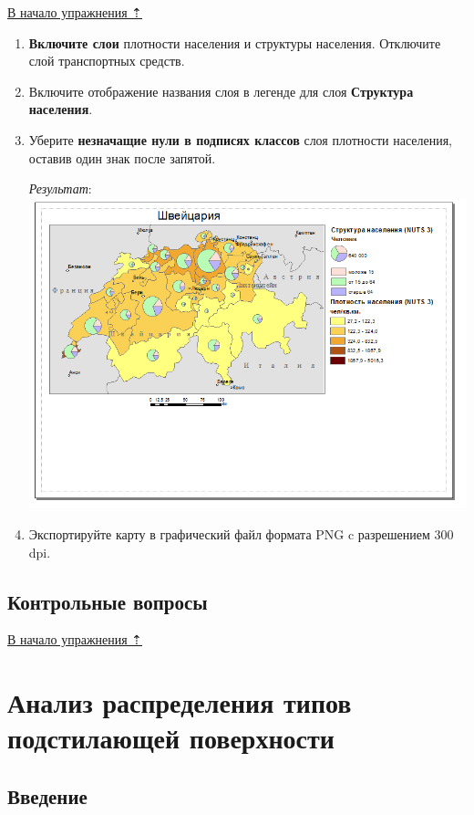 \documentclass[]{book}
\theoremstyle{definition}
\theoremstyle{definition}
\theoremstyle{definition}
\theoremstyle{remark}
\begin{document}
\protect\hyperlink{stat-map-economic}{В начало упражнения ⇡}

\begin{enumerate}
\def\labelenumi{\arabic{enumi}.}
\item
  \textbf{Включите слои} плотности населения и структуры населения.
  Отключите слой транспортных средств.
\item
  Включите отображение названия слоя в легенде для слоя
  \textbf{Структура населения}.
\item
  Уберите \textbf{незначащие нули в подписях классов} слоя плотности
  населения, оставив один знак после запятой.

  \emph{Результат}: \includegraphics{images/Ex08/image34.png}
\item
  Экспортируйте карту в графический файл формата PNG c разрешением 300
  dpi.
\end{enumerate}

\hypertarget{stat-map-economic-export-questions}{%
\section{Контрольные вопросы}\label{stat-map-economic-export-questions}}

\protect\hyperlink{stat-map-economic}{В начало упражнения ⇡}

\hypertarget{land-cover-hydro}{%
\chapter{Анализ распределения типов подстилающей
поверхности}\label{land-cover-hydro}}

\hypertarget{land-cover-hydro-intro}{%
\section{Введение}\label{land-cover-hydro-intro}}
\end{document}
